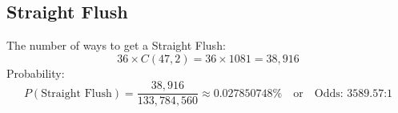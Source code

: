 \documentclass{article}
\begin{document}
\subsection*{Straight Flush}
The number of ways to get a Straight Flush:
\[
36 \times C(47, 2) = 36 \times 1081 = 38,916
\]
Probability:
\[
P(\text{Straight Flush}) = \frac{38,916}{133,784,560} \approx 0.027850748\% \quad \text{or} \quad \text{Odds: 3589.57:1}
\]

\end{document}
